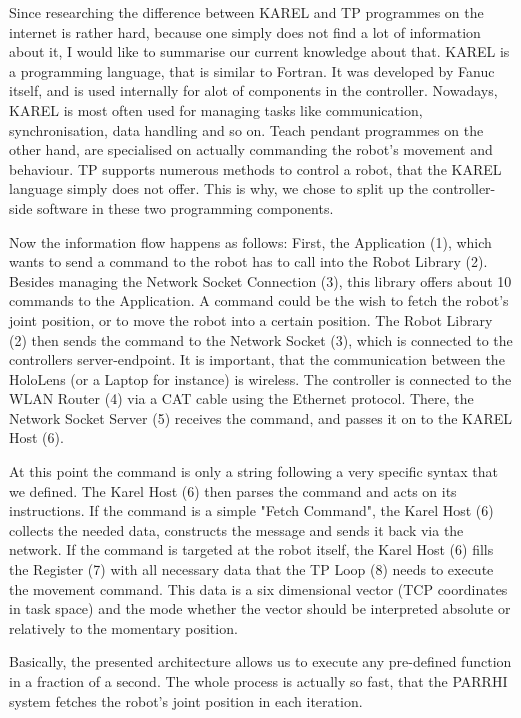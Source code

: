 Since researching the difference between KAREL and TP programmes on the internet is rather hard, because one simply does not find a lot of information about it, I would like to summarise our current knowledge about that. KAREL is a programming language, that is similar to Fortran. It was developed by Fanuc itself, and is used internally for alot of components in the controller. Nowadays, KAREL is most often used for managing tasks like communication, synchronisation, data handling and so on. Teach pendant programmes on the other hand, are specialised on actually commanding the robot's movement and behaviour. TP supports numerous methods to control a robot, that the KAREL language simply does not offer. This is why, we chose to split up the controller-side software in these two programming components.

Now the information flow happens as follows: First, the Application (1), which wants to send a command to the robot has to call into the Robot Library (2). Besides managing the Network Socket Connection (3), this library offers about 10 commands to the Application. A command could be the wish to fetch the robot's joint position, or to move the robot into a certain position. The Robot Library (2) then sends the command to the Network Socket (3), which is connected to the controllers server-endpoint. It is important, that the communication between the HoloLens (or a Laptop for instance) is wireless. The controller is connected to the WLAN Router (4) via a CAT cable using the Ethernet protocol. There, the Network Socket Server (5) receives the command, and passes it on to the KAREL Host (6). 

At this point the command is only a string following a very specific syntax that we defined. The Karel Host (6) then parses the command and acts on its instructions. If the command is a simple "Fetch Command", the Karel Host (6) collects the needed data, constructs the message and sends it back via the network. If the command is targeted at the robot itself, the Karel Host (6) fills the Register (7) with all necessary data that the TP Loop (8) needs to execute the movement command. This data is a six dimensional vector (TCP coordinates in task space) and the mode whether the vector should be interpreted absolute or relatively to the momentary position.

Basically, the presented architecture allows us to execute any pre-defined function in a fraction of a second. The whole process is actually so fast, that the PARRHI system fetches the robot's joint position in each iteration.

